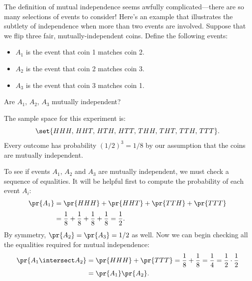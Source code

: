 The definition of mutual independence seems awfully
complicated---there are so many selections of events to consider!
Here's an example that illustrates the subtlety of independence when
more than two events are involved.  Suppose that we flip three fair,
mutually-independent coins.  Define the following events:
%
\begin{itemize}
\item $A_1$ is the event that coin 1 matches coin 2.
\item $A_2$ is the event that coin 2 matches coin 3.
\item $A_3$ is the event that coin 3 matches coin 1.
\end{itemize}
%
Are $A_1$, $A_2$, $A_3$ mutually independent?

The sample space for this experiment is:
%
\[
    \set{HHH,\, HHT,\, HTH,\, HTT,\, THH,\, THT,\, TTH,\, TTT}.
\]
%
Every outcome has probability $(1/2)^3 = 1/8$ by our assumption that
the coins are mutually independent.

To see if events $A_1$, $A_2$ and $A_3$ are mutually independent, we
must check a sequence of equalities.  It will be helpful first to
compute the probability of each event $A_i$:
%
\begin{align*}
\pr{A_1} & = \pr{HHH} + \pr{HHT} + \pr{TTH} + \pr{TTT} \\[2pt]
         & = \frac{1}{8} + \frac{1}{8} + \frac{1}{8} + \frac{1}{8}%
          = \frac{1}{2}.
\end{align*}
%
By symmetry, $\pr{A_2} = \pr{A_3} = 1/2$ as well.  Now we can begin
checking all the equalities required for mutual independence:
\begin{align*}
\pr{A_1 \intersect A_2}
       & = \pr{HHH} + \pr{TTT}
         = \frac{1}{8} + \frac{1}{8}
         = \frac{1}{4}
         = \frac{1}{2} \cdot \frac{1}{2}\\
       & = \pr{A_1} \pr{A_2}.
\end{align*}

